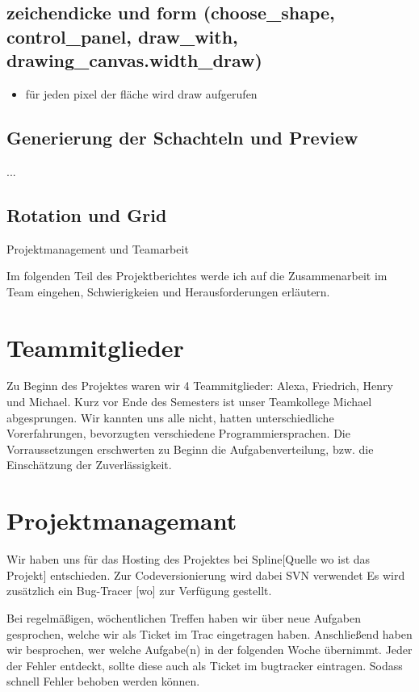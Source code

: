\subsection{zeichendicke und form (choose\_shape, control\_panel, draw\_with,
drawing\_canvas.width\_draw)}
\begin{itemize}
\item für jeden pixel der fläche wird draw aufgerufen
\end{itemize}

\subsection{Generierung der Schachteln und Preview}

...


\subsection{Rotation und Grid}

Projektmanagement und Teamarbeit

Im folgenden Teil des Projektberichtes werde ich auf die Zusammenarbeit
im Team eingehen, Schwierigkeien und Herausforderungen erläutern.


\section{Teammitglieder}

Zu Beginn des Projektes waren wir 4 Teammitglieder: Alexa, Friedrich,
Henry und Michael. Kurz vor Ende des Semesters ist unser Teamkollege
Michael abgesprungen. Wir kannten uns alle nicht, hatten unterschiedliche
Vorerfahrungen, bevorzugten verschiedene Programmiersprachen. Die
Vorraussetzungen erschwerten zu Beginn die Aufgabenverteilung, bzw.
die Einschätzung der Zuverlässigkeit.


\section{Projektmanagemant}

Wir haben uns für das Hosting des Projektes bei Spline{[}Quelle wo
ist das Projekt{]} entschieden. Zur Codeversionierung wird dabei SVN
verwendet Es wird zusätzlich ein Bug-Tracer {[}wo{]} zur Verfügung
gestellt. 

Bei regelmäßigen, wöchentlichen Treffen haben wir über neue Aufgaben
gesprochen, welche wir als Ticket im Trac eingetragen haben. Anschließend
haben wir besprochen, wer welche Aufgabe(n) in der folgenden Woche
übernimmt. Jeder der Fehler entdeckt, sollte diese auch als Ticket
im bugtracker eintragen. Sodass schnell Fehler behoben werden können.


